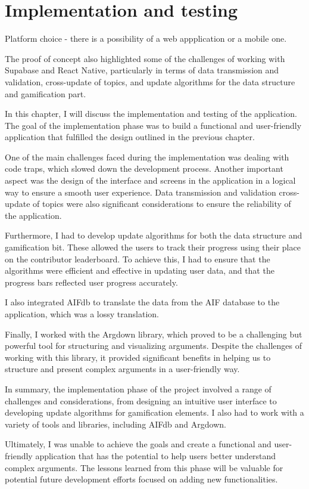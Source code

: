 \documentclass{article}
\begin{document}
\chapter{Implementation and testing}
Platform choice - there is a possibility of a web appplication or a mobile one.

The proof of concept also highlighted some of the challenges of working with Supabase and React Native, particularly in terms of data transmission and validation, cross-update of topics, and update algorithms for the data structure and gamification part.

In this chapter, I will discuss the implementation and testing of the application. The goal of the implementation phase was to build a functional and user-friendly application that fulfilled the design outlined in the previous chapter.

One of the main challenges faced during the implementation was dealing with code traps, which slowed down the development process. Another important aspect was the design of the interface and screens in the application in a logical way to ensure a smooth user experience. Data transmission and validation cross-update of topics were also significant considerations to ensure the reliability of the application.

Furthermore, I had to develop update algorithms for both the data structure and gamification bit. These allowed the users to track their progress using their place on the contributor leaderboard. To achieve this, I had to ensure that the algorithms were efficient and effective in updating user data, and that the progress bars reflected user progress accurately.

I also integrated AIFdb to translate the data from the AIF database to the application, which was a lossy translation.

Finally, I worked with the Argdown library, which proved to be a challenging but powerful tool for structuring and visualizing arguments. Despite the challenges of working with this library, it provided significant benefits in helping us to structure and present complex arguments in a user-friendly way.

In summary, the implementation phase of the project involved a range of challenges and considerations, from designing an intuitive user interface to developing update algorithms for gamification elements. I also had to work with a variety of tools and libraries, including AIFdb and Argdown. 

Ultimately, I was unable to achieve the goals and create a functional and user-friendly application that has the potential to help users better understand complex arguments. The lessons learned from this phase will be valuable for potential future development efforts focused on adding new functionalities.
\end{document}
